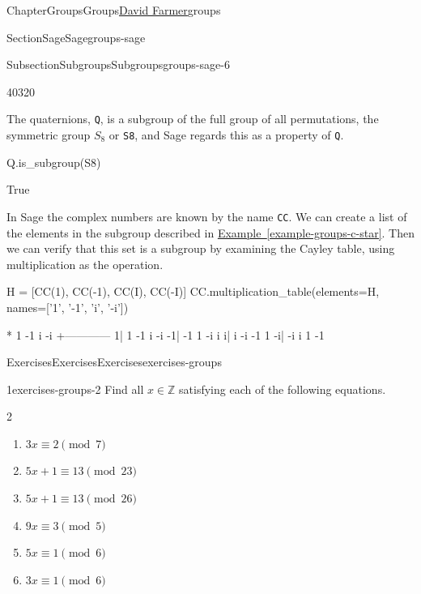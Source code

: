 \documentclass[oneside,10pt,]{book}
\newcommand{\xreffont}{\relax}
\newcommand{\mono}[1]{\texttt{#1}}
\numberwithin{equation}{section}
\begin{document}
\begin{chapterptx}{Chapter}{Groups}{}{Groups}{\hyperlink{dfarmer}{David Farmer}}{}{groups}
\begin{sectionptx}{Section}{Sage}{}{Sage}{}{}{groups-sage}
\begin{subsectionptx}{Subsection}{Subgroups}{}{Subgroups}{}{}{groups-sage-6}
\begin{sageoutput}
40320
\end{sageoutput}
The quaternions, \mono{Q}, is a subgroup of the full group of all permutations, the symmetric group \(S_8\) or \mono{S8}, and Sage regards this as a property of \mono{Q}.%
\begin{sageinput}
Q.is_subgroup(S8)
\end{sageinput}
\begin{sageoutput}
True
\end{sageoutput}
In Sage the complex numbers are known by the name \mono{CC}.  We can create a list of the elements in the subgroup described in \hyperref[example-groups-c-star]{Example~{\xreffont\ref{example-groups-c-star}}}.  Then we can verify that this set is a subgroup by examining the Cayley table, using multiplication as the operation.%
\begin{sageinput}
H = [CC(1), CC(-1), CC(I), CC(-I)]
CC.multiplication_table(elements=H,
                        names=['1', '-1', 'i', '-i'])
\end{sageinput}
\begin{sageoutput}
*   1 -1  i -i
  +------------
 1|  1 -1  i -i
-1| -1  1 -i  i
 i|  i -i -1  1
-i| -i  i  1 -1
\end{sageoutput}
\end{subsectionptx}
\end{sectionptx}
%
%
\typeout{************************************************}
\typeout{************************************************}
%
\begin{exercises-section}{Exercises}{Exercises}{}{Exercises}{}{}{exercises-groups}
\begin{divisionexercise}{1}{}{}{exercises-groups-2}%
Find all \(x \in {\mathbb Z}\) satisfying each of the following equations.%
%
\begin{multicols}{2}
\begin{enumerate}[label={(\alph*)}]
\item{}\(\displaystyle 3x \equiv 2 \pmod{7}\)%
\item{}\(\displaystyle 5x + 1 \equiv 13 \pmod{23}\)%
\item{}\(\displaystyle 5x + 1 \equiv 13 \pmod{26}\)%
\item{}\(\displaystyle 9x \equiv 3 \pmod{5}\)%
\item{}\(\displaystyle 5x \equiv 1 \pmod{6}\)%
\item{}\(\displaystyle 3x \equiv 1 \pmod{6}\)%
\end{enumerate}
\end{multicols}

\end{divisionexercise}
\end{exercises-section}
\end{chapterptx}
\end{document}
